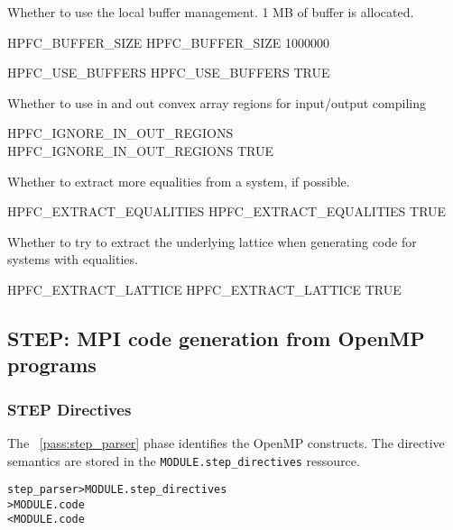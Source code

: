 \documentclass[a4paper]{report}
\newenvironment{PipsMake}{\begin{alltt}}{\end{alltt}}
\newcommand{\PipsPassRef}[1]{\texttt{\detokenize{#1}}~\ref{pass:#1}}
\newenvironment{PipsPass}[1]{\label{pass:#1}}{}
\begin{document}
Whether to use the local buffer management. 1 MB of buffer is allocated.

\begin{PipsProp}{HPFC_BUFFER_SIZE}
HPFC_BUFFER_SIZE 1000000
\end{PipsProp}
\begin{PipsProp}{HPFC_USE_BUFFERS}
HPFC_USE_BUFFERS TRUE
\end{PipsProp}

Whether to use in and out convex array regions for input/output compiling

\begin{PipsProp}{HPFC_IGNORE_IN_OUT_REGIONS}
HPFC_IGNORE_IN_OUT_REGIONS TRUE
\end{PipsProp}

Whether to extract more equalities from a system, if possible.

\begin{PipsProp}{HPFC_EXTRACT_EQUALITIES}
HPFC_EXTRACT_EQUALITIES TRUE
\end{PipsProp}

Whether to try to extract the underlying lattice when generating code for
systems with equalities.

\begin{PipsProp}{HPFC_EXTRACT_LATTICE}
HPFC_EXTRACT_LATTICE TRUE
\end{PipsProp}


\subsection{STEP: MPI code generation from OpenMP programs}
\label{sec:step:-mpi-code}



\subsubsection{STEP Directives}

\begin{PipsPass}{step_parser}
The \PipsPassRef{step_parser} phase identifies the OpenMP
constructs. The directive semantics are stored in the
\texttt{MODULE.step\_directives} ressource.
\end{PipsPass}

\begin{PipsMake}
step_parser                 > MODULE.step_directives
                            > MODULE.code
   < MODULE.code
\end{PipsMake}
\end{document}
